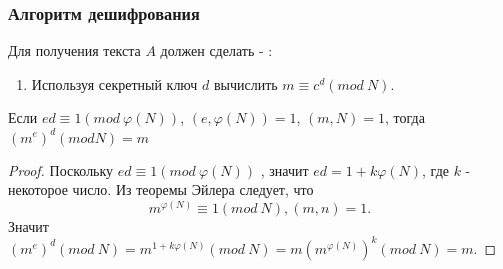   \subsubsection{Алгоритм дешифрования}
  Для получения текста $A$ должен сделать - \cite[Глава 9, страницы 148-155]{tilb06}:
    
    \begin{enumerate}
     \item Используя секретный ключ $d$ вычислить $m \equiv c^{d} (mod \: N)$.
    \end{enumerate}  
    
  \begin{theorem}
    Если $ed \equiv 1(mod \: \varphi(N))$, $(e, \varphi(N)) = 1$, $(m, N)=1$, тогда $(m^{e})^{d} (mod N) = m$

    \begin{proof}
      Поскольку $ed \equiv 1(mod \: \varphi(N))$ , значит $ed = 1 + k \varphi(N)$, где $k$ - некоторое число. Из теоремы Эйлера следует,
      что 
        \begin{equation}
          m^{\varphi(N)} \equiv 1(mod \: N), (m, n) = 1.
        \end{equation}
      Значит $(m^e)^d (mod \: N) = m^{1 + k \varphi(N)}(mod \: N) = m (m^{\varphi(N)})^k (mod \: N) = m$.
    \end{proof}
  \end{theorem}